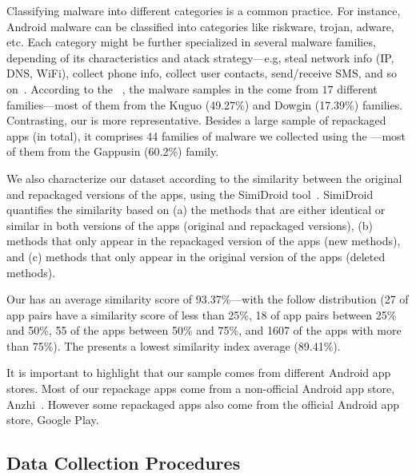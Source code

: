 Classifying malware into different categories is a common practice. For instance, Android malware can be classified into categories
like riskware, trojan, adware, etc. Each category might be further specialized in several malware families, depending of its
characteristics and atack strategy---e.g, steal network info (IP, DNS, WiFi), collect phone info,
collect user contacts, send/receive SMS, and so on~\cite{DBLP:conf/iccns/RahaliLKTGM20}.
According to the
\avt~\cite{avclass2-paper}, the malware samples in the \sds come from $17$ different families---most of them from the Kuguo (49.27\%) and Dowgin (17.39\%) families.
Contrasting, our \cds is more representative. Besides a large sample of repackaged apps (\apps in total), it
comprises 44 families of malware we collected using the \avt---most
of them from the Gappusin (60.2\%) family.

We also characterize our dataset according to the similarity
between the original and repackaged versions of the apps, using the  
SimiDroid tool~\cite{DBLP:conf/trustcom/0029BK17}. SimiDroid quantifies the similarity
based on (a) the methods that are either identical or similar in both versions of the apps (original and repackaged versions),
(b) methods that only appear in the repackaged version of the apps (new methods), and (c) methods that only appear in the
original version of the apps (deleted methods).

Our \cds has an average similarity score of 93.37\%---with the follow distribution {\color{red}(27 of
app pairs have a similarity score of less than 25\%, 18 of app pairs
between 25\% and 50\%,  55 of the apps between 50\% and 75\%,
and 1607 of the apps with more than 75\%). The \sds presents a lowest
similarity index average (89.41\%)}. 

It is important to highlight that our sample comes
from different Android app stores. Most of our repackage apps come from a non-official
Android app store, Anzhi~\cite{anzhi}. However some repackaged apps also come from the
official Android app store, Google Play.




\subsection{Data Collection Procedures} \label{sec:dataCollectionProc}

